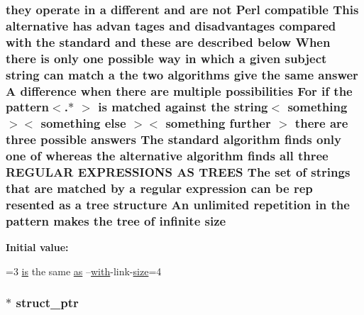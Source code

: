 \subsubsection[{\texorpdfstring{size}{size}}]{\setlength{\rightskip}{0pt plus 5cm}they operate {\bf in} {\bf a} different and {\bf are} {\bf not} {\bf Perl} compatible This alternative has advan tages and disadvantages compared {\bf with} the standard and these {\bf are} described {\bf below} When there {\bf is} only one {\bf possible} {\bf way} {\bf in} {\bf which} {\bf a} {\bf given} subject {\bf string} {\bf can} {\bf match} {\bf a} the two {\bf algorithms} give the same answer {\bf A} difference when there {\bf are} multiple possibilities For {\bf if} the {\bf pattern}$<$.$\ast$ $>$ {\bf is} {\bf matched} against the {\bf string}$<$ something $>$$<$ something else $>$$<$ something further $>$ there {\bf are} three {\bf possible} answers The standard {\bf algorithm} finds only one {\bf of} whereas the alternative {\bf algorithm} finds {\bf all} three R\+E\+G\+U\+L\+AR E\+X\+P\+R\+E\+S\+S\+I\+O\+NS AS T\+R\+E\+ES The {\bf set} {\bf of} {\bf strings} that {\bf are} {\bf matched} by {\bf a} regular {\bf expression} {\bf can} {\bf be} rep resented {\bf as} {\bf a} tree structure An unlimited {\bf repetition} {\bf in} the {\bf pattern} makes the tree {\bf of} infinite size}\hypertarget{group__APACHE__CORE__CONFIG_ga2bd3edb50f631a96f1b729fde236ff43}{}\label{group__APACHE__CORE__CONFIG_ga2bd3edb50f631a96f1b729fde236ff43}
{\bfseries Initial value\+:}
\begin{DoxyCode}
=3 \hyperlink{pcre_8txt_a7d947c770a43ed118ff283c41a1b303c}{is}
  the same \hyperlink{pcre_8txt_a98d9d1d08c2c07470cdc46401df8d7f8}{as} --\hyperlink{group__apr__atomic_ga62bdcea60b77e638d3d88947a34aff05}{with}-link-\hyperlink{group__APACHE__CORE__CONFIG_ga2bd3edb50f631a96f1b729fde236ff43}{size}=4
\end{DoxyCode}
\subsubsection[{\texorpdfstring{struct\+\_\+ptr}{struct_ptr}}]{ $\ast$ struct\+\_\+ptr}\hypertarget{group__APACHE__CORE__CONFIG_gaac79162f1905c3606949025ab33fa601}{}\label{group__APACHE__CORE__CONFIG_gaac79162f1905c3606949025ab33fa601}
